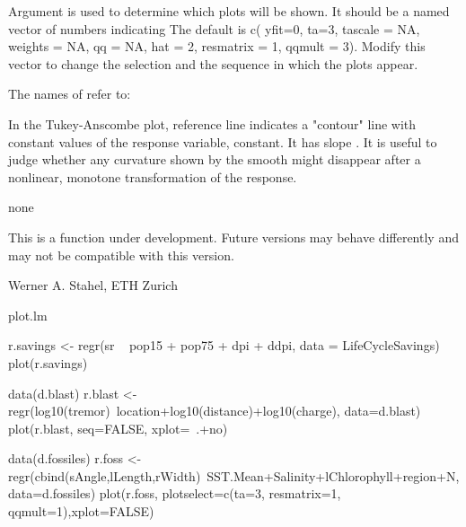 \documentclass{article}
\begin{document}
\begin{Details}\relax
Argument  is used to determine which plots will be
shown. It should be a named vector of numbers indicating
The default is
c( yfit=0, ta=3, tascale = NA, weights = NA, qq = NA, hat = 2,
resmatrix = 1, qqmult = 3).
Modify this vector to change the selection and the sequence in
which the plots appear.

The names of  refer to:

In the Tukey-Anscombe plot, reference line indicates a "contour"
line with constant values of the response variable,
 constant. It has slope .
It is useful to judge whether any curvature shown by the smooth
might disappear after a nonlinear, monotone transformation of the
response.
\end{Details}
\begin{Value}
none
\end{Value}
\begin{Note}\relax
This is a function under development. Future versions may behave
differently and may not be compatible with this version.
\end{Note}
\begin{Author}\relax
Werner A. Stahel, ETH Zurich
\end{Author}
\begin{SeeAlso}\relax
plot.lm
\end{SeeAlso}
\begin{Examples}
\begin{ExampleCode}
  r.savings <- regr(sr ~ pop15 + pop75 + dpi + ddpi, data = LifeCycleSavings)
  plot(r.savings)

  data(d.blast)
  r.blast <-
       regr(log10(tremor)~location+log10(distance)+log10(charge),
            data=d.blast)
  plot(r.blast, seq=FALSE, xplot=~.+no) 

  data(d.fossiles)
  r.foss <-
    regr(cbind(sAngle,lLength,rWidth)~SST.Mean+Salinity+lChlorophyll+region+N,
    data=d.fossiles)
  plot(r.foss, plotselect=c(ta=3, resmatrix=1, qqmult=1),xplot=FALSE)
\end{ExampleCode}
\end{Examples}
\end{document}
